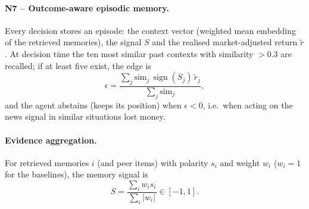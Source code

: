 \paragraph{N7 -- Outcome-aware episodic memory.} Every decision stores an episode: the context vector (weighted mean embedding of the retrieved memories), the signal $S$ and the realised market-adjusted return $\tilde r$. At decision time the ten most similar past contexts with similarity $>0.3$ are recalled; if at least five exist, the edge is
\begin{equation}
\epsilon=\frac{\sum_j \text{sim}_j\,\operatorname{sign}(S_j)\,\tilde r_j}{\sum_j \text{sim}_j},
\end{equation}
and the agent abstains (keeps its position) when $\epsilon<0$, i.e.\ when acting on the news signal in similar situations lost money.

\paragraph{Evidence aggregation.} For retrieved memories $i$ (and peer items) with polarity $s_i$ and weight $w_i$ ($w_i=1$ for the baselines), the memory signal is
\begin{equation}
S=\frac{\sum_i w_i s_i}{\sum_i |w_i|}\in[-1,1].
\end{equation}


